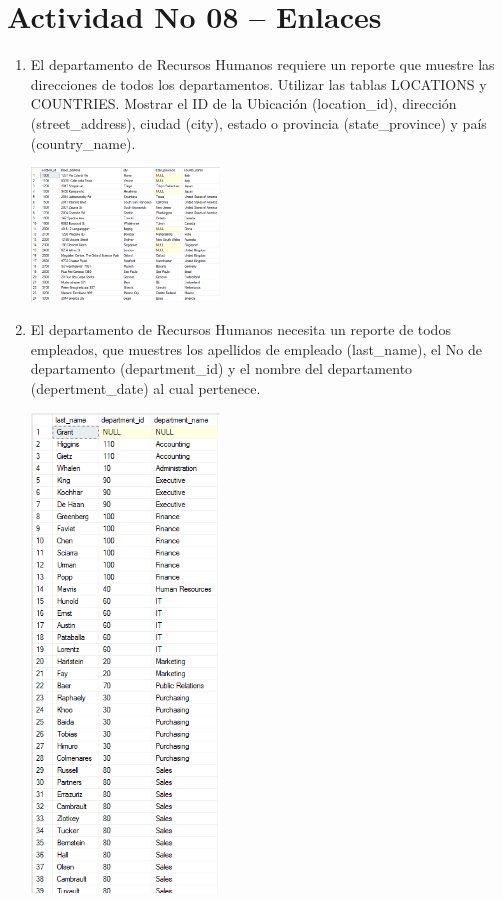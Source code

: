 \section{Actividad No 08 – Enlaces} 
		
\begin{enumerate}[1.]
	\item El departamento de Recursos Humanos requiere un reporte que muestre las direcciones de todos los departamentos. Utilizar las tablas LOCATIONS y COUNTRIES. Mostrar el ID de la Ubicación (location\_id), dirección (street\_address), ciudad (city), estado o provincia (state\_province) y país (country\_name). %
	\begin{center}
	\includegraphics[width=5cm]{./Imagenes/actividad_08_01} 
	\end{center}


	\item El departamento de Recursos Humanos necesita un reporte de todos empleados, que muestres los apellidos de empleado (last\_name), el No de departamento (department\_id) y el nombre del departamento (depertment\_date) al cual pertenece. 

	\begin{center}
	\includegraphics[width=5cm]{./Imagenes/actividad_08_02} 
	\end{center}


\end{enumerate}
